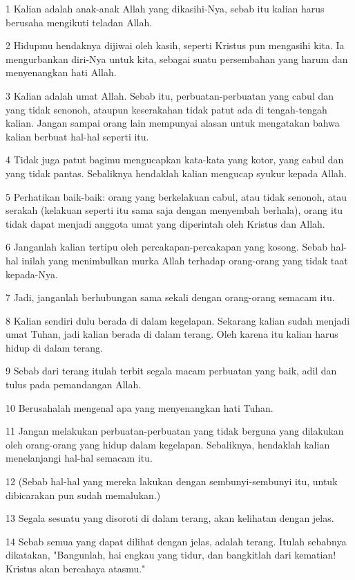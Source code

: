 \par 1 Kalian adalah anak-anak Allah yang dikasihi-Nya, sebab itu kalian harus berusaha mengikuti teladan Allah.
\par 2 Hidupmu hendaknya dijiwai oleh kasih, seperti Kristus pun mengasihi kita. Ia mengurbankan diri-Nya untuk kita, sebagai suatu persembahan yang harum dan menyenangkan hati Allah.
\par 3 Kalian adalah umat Allah. Sebab itu, perbuatan-perbuatan yang cabul dan yang tidak senonoh, ataupun keserakahan tidak patut ada di tengah-tengah kalian. Jangan sampai orang lain mempunyai alasan untuk mengatakan bahwa kalian berbuat hal-hal seperti itu.
\par 4 Tidak juga patut bagimu mengucapkan kata-kata yang kotor, yang cabul dan yang tidak pantas. Sebaliknya hendaklah kalian mengucap syukur kepada Allah.
\par 5 Perhatikan baik-baik: orang yang berkelakuan cabul, atau tidak senonoh, atau serakah (kelakuan seperti itu sama saja dengan menyembah berhala), orang itu tidak dapat menjadi anggota umat yang diperintah oleh Kristus dan Allah.
\par 6 Janganlah kalian tertipu oleh percakapan-percakapan yang kosong. Sebab hal-hal inilah yang menimbulkan murka Allah terhadap orang-orang yang tidak taat kepada-Nya.
\par 7 Jadi, janganlah berhubungan sama sekali dengan orang-orang semacam itu.
\par 8 Kalian sendiri dulu berada di dalam kegelapan. Sekarang kalian sudah menjadi umat Tuhan, jadi kalian berada di dalam terang. Oleh karena itu kalian harus hidup di dalam terang.
\par 9 Sebab dari terang itulah terbit segala macam perbuatan yang baik, adil dan tulus pada pemandangan Allah.
\par 10 Berusahalah mengenal apa yang menyenangkan hati Tuhan.
\par 11 Jangan melakukan perbuatan-perbuatan yang tidak berguna yang dilakukan oleh orang-orang yang hidup dalam kegelapan. Sebaliknya, hendaklah kalian menelanjangi hal-hal semacam itu.
\par 12 (Sebab hal-hal yang mereka lakukan dengan sembunyi-sembunyi itu, untuk dibicarakan pun sudah memalukan.)
\par 13 Segala sesuatu yang disoroti di dalam terang, akan kelihatan dengan jelas.
\par 14 Sebab semua yang dapat dilihat dengan jelas, adalah terang. Itulah sebabnya dikatakan, "Bangunlah, hai engkau yang tidur, dan bangkitlah dari kematian! Kristus akan bercahaya atasmu."
